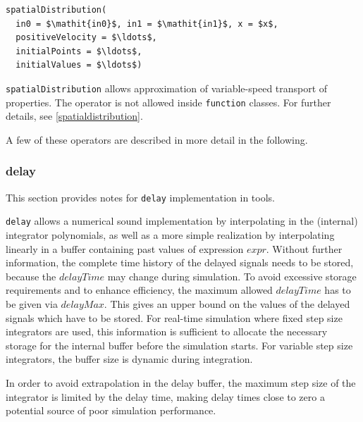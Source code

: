 \begin{operatordefinition}[spatialDistribution]
\begin{synopsis}\begin{lstlisting}
spatialDistribution(
  in0 = $\mathit{in0}$, in1 = $\mathit{in1}$, x = $x$,
  positiveVelocity = $\ldots$,
  initialPoints = $\ldots$,
  initialValues = $\ldots$)
\end{lstlisting}\end{synopsis}
\begin{semantics}
\lstinline!spatialDistribution! allows approximation of variable-speed transport of properties.
The operator is not allowed inside \lstinline!function! classes.
For further details, see \cref{spatialdistribution}.
\end{semantics}
\end{operatordefinition}

A few of these operators are described in more detail in the following.


\subsubsection{delay}\label{delay}

This section provides notes for \lstinline!delay! implementation in tools.

\begin{nonnormative}
\lstinline!delay! allows a numerical sound implementation by interpolating in the (internal) integrator polynomials, as well as a more simple realization by interpolating linearly in a buffer containing past values of expression $\mathit{expr}$.
Without further information, the complete time history of the delayed signals needs to be stored, because the $\mathit{delayTime}$ may change during simulation.
To avoid excessive storage requirements and to enhance efficiency, the maximum allowed $\mathit{delayTime}$ has to be given via $\mathit{delayMax}$.
This gives an upper bound on the values of the delayed signals which have to be stored.
For real-time simulation where fixed step size integrators are used, this information is sufficient to allocate the necessary storage for the internal buffer before the simulation starts.
For variable step size integrators, the buffer size is dynamic during integration.

In order to avoid extrapolation in the delay buffer, the maximum step size of the integrator is limited by the delay time, making delay times close to zero a potential source of poor simulation performance.
\end{nonnormative}


